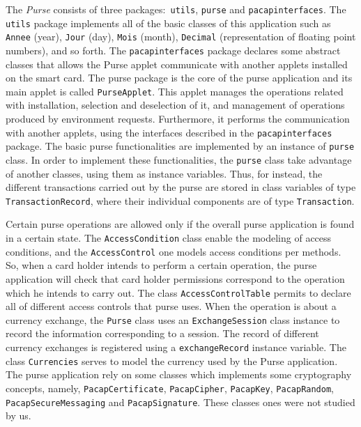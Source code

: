 \documentclass[a4paper]{llncs}
\begin{document}
The \textit{Purse} consists of three packages$:$ \texttt{utils},
\texttt{purse} and \texttt{pacapinterfaces}. The {\tt utils} package
implements all of the basic classes of this application such 
as \texttt{Annee} (year), \texttt{Jour} (day), \texttt{Mois}
(month), \texttt{Decimal} (representation of floating point numbers),
and so forth. The
\texttt{pacapinterfaces} package declares some abstract classes that
allows the Purse applet communicate with another applets installed on 
the smart card. The purse package is the core of the purse application 
and its
main applet is called \texttt{PurseApplet}. This applet manages the
operations related with installation, selection and deselection of it,
and management of operations produced by environment requests.
Furthermore, it performs the
communication with another applets, using the interfaces described in
the \texttt{pacapinterfaces} package. The basic purse functionalities
are implemented by an instance of \texttt{purse} class. In order to
implement these functionalities, the \texttt{purse} class take
advantage of another classes, using them as instance variables. Thus,
for instead, the different
transactions carried out by the purse are stored in class variables of
type \texttt{TransactionRecord}, where their individual components are
of type \texttt{Transaction}. 

Certain purse operations are allowed only
if the overall purse application is found in a certain state. The
\texttt{AccessCondition} class enable the modeling of access
conditions, and the \texttt{AccessControl} one models access conditions
per methods. So, when a card holder intends to perform a certain
operation, the purse application will check that card holder
permissions correspond to the
operation which he intends to carry out. The class
\texttt{AccessControlTable} permits to declare
all of different access controls that purse uses. When the operation is
about a currency exchange, the 
\texttt{Purse} class uses an \texttt{ExchangeSession} class instance to 
record the information corresponding to a session. The record of
different currency exchanges is registered using a
\texttt{exchangeRecord} instance variable. The class
\texttt{Currencies} serves to model the currency used by the Purse
application. 
The purse application rely on some classes which implements some cryptography
concepts, namely, \texttt{PacapCertificate},
\texttt{PacapCipher}, \texttt{PacapKey}, \texttt{PacapRandom},
\texttt{PacapSecureMessaging} and \texttt{PacapSignature}. These
classes ones were not studied by us.
\end{document}
